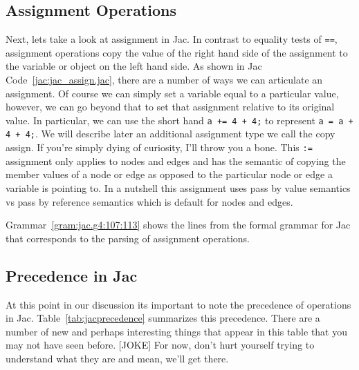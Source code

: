\subsection{Assignment Operations}
Next, lets take a look at assignment in Jac. In contrast to equality tests of \texttt{==}, assignment operations copy the value of the right hand side of the assignment to the variable or object on the left hand side.
As shown in Jac Code~\ref{jac:jac_assign.jac}, there are a number of ways we can articulate an assignment. Of course we can simply set a variable equal to a particular value, however, we can go beyond that to set that assignment relative to its original value. In particular, we can use the short hand \texttt{a += 4 + 4;} to represent \texttt{a = a + 4 + 4;}. We will describe later an additional assignment type we call the copy assign. If you're simply dying of curiosity, I'll throw you a bone. This \texttt{:=} assignment only applies to nodes and edges and has the semantic of copying the member values of a node or edge as opposed to the particular node or edge a variable is pointing to. In a nutshell this assignment uses pass by value semantics vs pass by reference semantics which is default for nodes and edges.

\begin{nerd}
    Grammar~\ref{gram:jac.g4:107:113} shows the lines from the formal grammar for Jac that corresponds to the parsing of assignment operations.
\end{nerd}



\subsection{Precedence in Jac}
\printtabPrecedence
At this point in our discussion its important to note the precedence of operations in Jac. Table~\ref{tab:jacprecedence} summarizes this precedence. There are a number of new and perhaps interesting things that appear in this table that you may not have seen before. [JOKE] For now, don't hurt yourself trying to understand what they are and mean, we'll get there.



